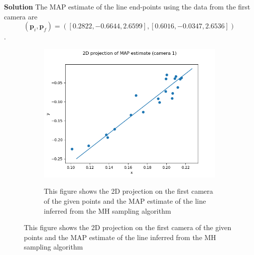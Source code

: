 \documentclass[10pt]{article}
\begin{document}
\begin{enumerate}
{\bf Solution}
The MAP estimate of the line end-points using the data from the first camera are $$(\mathbf{p}_{i},\mathbf{p}_f) = ([ 0.2822, -0.6644,  2.6599],[0.6016, -0.0347,  2.6536])$$. 


\begin{figure}[h!]
\centering
\begin{subfigure}[]{.50\textwidth}
\includegraphics[width=1\linewidth]{figures/cam1.png}
  \label{fig:cam1}
\caption{This figure shows the 2D projection on the first camera of the given points and the MAP estimate of the line inferred from the MH sampling algorithm}
\end{subfigure}
\end{figure}




\end{enumerate}
\end{document}
